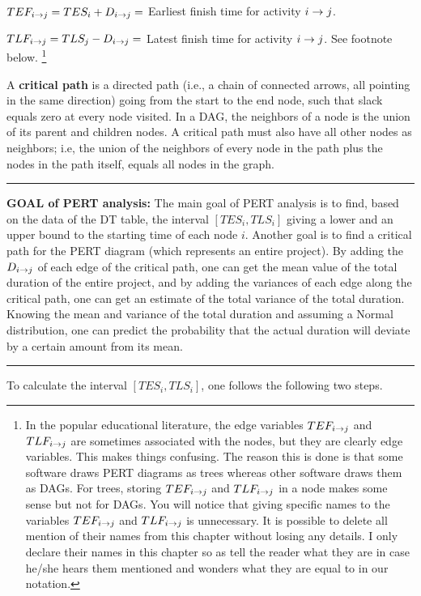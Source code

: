 $TEF_{i\rightarrow j}=TES_i + D_{i\rightarrow j}=$ 
Earliest finish 
time for activity $i\rightarrow j$.

$TLF_{i\rightarrow j}=TLS_j-D_{i\rightarrow j}=$ 
 Latest finish 
time for activity $i\rightarrow j$. See footnote below.
\footnote{
In the popular educational literature,
the edge variables
$TEF_{i\rightarrow j}$
and $TLF_{i\rightarrow j}$
are sometimes associated 
 with
the nodes, but they 
are clearly edge variables.
This makes things confusing.
The reason this is done is
that some software draws PERT diagrams as
trees whereas other software
draws them as DAGs. For trees,
storing $TEF_{i\rightarrow j}$
and $TLF_{i\rightarrow j}$ in a node
makes some sense but not for DAGs.
You will notice that giving specific names
to the variables
$TEF_{i\rightarrow j}$
and $TLF_{i\rightarrow j}$ 
is  unnecessary.
It is possible
to delete all 
mention of their names 
from this chapter
without
losing any details. I only declare
their names 
in this chapter so as tell the reader 
what they are in case he/she
hears them mentioned
and wonders what they are
equal to in our notation.}



A {\bf critical path} is a directed path
(i.e., a chain of connected arrows,
all pointing in the same direction)
going from the start  to the end node, such that 
slack equals zero at every node visited.
In a DAG, the neighbors
of a node is the union of its parent
 and children nodes.
A critical path must also have all other nodes 
as neighbors; i.e, 
the union of the neighbors
of  every node in the path  plus
the nodes in the path itself, equals 
all nodes in the graph. 

\hrule
{\bf GOAL of PERT analysis:} The main
goal
of PERT analysis
is to find,
based on the data of the DT table, 
the interval $[TES_i, TLS_i]$
giving 
a lower and an upper bound
to the starting time of each node $i$.
Another goal is 
to find a critical path
for the PERT diagram (which
represents  an entire project).
By adding the $D_{i\rightarrow j}$
of each edge of the
critical path,
one can
get the mean value of the total
duration
of the entire project,
and by adding the
variances of each 
edge along the critical path,
one can get an estimate
of the total variance
of the total duration.
Knowing the mean and variance
of the total
duration
and assuming a Normal distribution,
one can
predict the probability
that the 
actual duration
will
deviate by a certain amount from its mean.
\hrule

To calculate the interval $[TES_i, TLS_i]$,
one follows the
following two steps.

